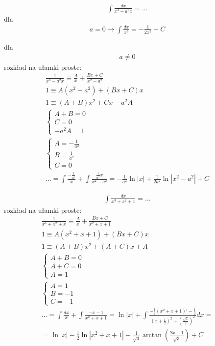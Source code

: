 
\begin{gather*}\int \frac{dx}{x^3-a^2x}=\ldots\end{gather*}
dla \begin{gather*}a=0 \to \int \frac{dx}{x^3} = -\frac{1}{2x^2}+C\end{gather*}

dla \begin{gather*}a\neq 0\end{gather*}
rozkład na ułamki proste:
\begin{gather*}\frac{1}{x^3-a^2x} \equiv \frac{A}{x}+\frac{Bx+C}{x^2-a^2} \\
1 \equiv A(x^2-a^2)+(Bx+C)x \\
1 \equiv (A+B)x^2+Cx-a^2A \\
\begin{cases} A+B=0 \\ C=0 \\ -a^2A=1 \end{cases} \\
\begin{cases} A=-\frac{1}{a^2} \\ B=\frac{1}{a^2} \\ C=0 \end{cases} \\
\ldots = \int \frac{-\frac{1}{a^2}}{x} + \int \frac{\frac{1}{a^2}x}{x^2-a^2} = -\frac{1}{a^2}\ln|x|+\frac{1}{2a^2}\ln|x^2-a^2|+C\end{gather*}



\begin{gather*}\int \frac{dx}{x^3+x^2+x}=\ldots\end{gather*}
rozkład na ułamki proste:
\begin{gather*}\frac{1}{x^3+x^2+x} \equiv \frac{A}{x}+\frac{Bx+C}{x^2+x+1} \\
1 \equiv A(x^2+x+1)+(Bx+C)x \\
1 \equiv (A+B)x^2+(A+C)x+A \\
\begin{cases} A+B=0 \\ A+C=0 \\ A=1 \end{cases} \\
\begin{cases} A=1 \\ B=-1 \\ C=-1 \end{cases} \\
\ldots = \int \frac{dx}{x} + \int \frac{-x-1}{x^2+x+1} = \ln|x|+\int \frac{-\frac{1}{2}(x^2+x+1)'-\frac{1}{2}}{(x+\frac{1}{2})^2+ (\frac{\sqrt{3}}{2})^2}dx = \\
= \ln|x|-\frac{1}{2}\ln|x^2+x+1|-\frac{1}{\sqrt{3}}\arctan \left(\frac{2x+1}{\sqrt{3}}\right)+C\end{gather*}


